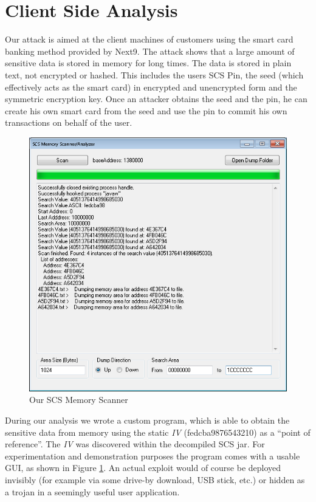 \section{Client Side Analysis}
Our attack is aimed at the client machines of customers using the smart card banking method provided by Next9. The attack shows that a large amount of sensitive data is stored in memory for long times. The data is stored in plain text, not encrypted or hashed. This includes the users SCS Pin, the seed (which effectively acts as the smart card) in encrypted and unencrypted form and the symmetric encryption key. Once an attacker obtains the seed and the pin, he can create his own smart card from the seed and use the pin to commit his own transactions on behalf of the user.
\begin{center}
\begin{figure}[hbtp]
        \centering
        \includegraphics[scale=0.6]{Scanner.png}
        \caption{Our SCS Memory Scanner}\label{figMemoryScanner}
\end{figure}
\end{center}
During our analysis we wrote a custom program, which is able to obtain the sensitive data from memory using the static \emph{IV} (fedcba9876543210) as a ``point of reference''. The \emph{IV} was discovered within the decompiled SCS jar. For experimentation and demonstration purposes the program comes with a usable GUI, as shown in Figure \ref{figMemoryScanner}. An actual exploit would of course be deployed invisibly (for example via some drive-by download, USB stick, etc.) or hidden as a trojan in a seemingly useful user application.

